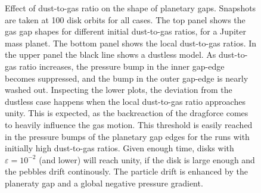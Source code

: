 \documentclass[onecolumn]{report}
\begin{document}
\begin{figure}
  \begin{center}
    \caption{Effect of dust-to-gas ratio on the shape of planetary gaps. Snapshots are taken at 100 disk orbits for all cases. The top panel shows the gas gap shapes for different initial dust-to-gas ratios, for a Jupiter mass planet. The bottom panel shows the local dust-to-gas ratios. In the upper panel the black line shows a dustless model. As dust-to-gas ratio increases, the pressure bump in the inner gap-edge becomes suppressed, and the bump in the outer gap-edge is nearly washed out. Inspecting the lower plots, the deviation from the dustless case happens when the local dust-to-gas ratio approaches unity. This is expected, as the backreaction of the dragforce comes to heavily influence the gas motion. This threshold is easily reached in the pressure bumps of the planetary gap edges for the runs with initially high dust-to-gas ratios. Given enough time, disks with $\varepsilon=10^{-2}$ (and lower) will reach unity, if the disk is large enough and the pebbles drift continously. The particle drift is enhanced by the planeraty gap and a global negative pressure gradient.}
  \label{fig:gapjupiter}
  \end{center}
\end{figure}
\end{document}

